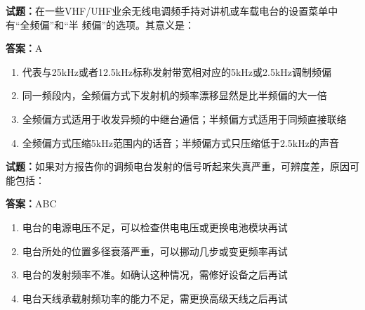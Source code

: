 \documentclass{ctexbook}
\begin{document}





\vspace{1em}

\textbf{试题：}在一些VHF/UHF业余无线电调频手持对讲机或车载电台的设置菜单中有“全频偏”和“半
频偏”的选项。其意义是： 

\textbf{答案：}A 

\begin{enumerate}[leftmargin=3em]
  \item 代表与25kHz或者12.5kHz标称发射带宽相对应的5kHz或2.5kHz调制频偏 

  \item 同一频段内，全频偏方式下发射机的频率漂移显然是比半频偏的大一倍 

  \item 全频偏方式适用于收发异频的中继台通信；半频偏方式适用于同频直接联络 

  \item 全频偏方式压缩5kHz范围内的话音；半频偏方式只压缩低于2.5kHz的声音 

\end{enumerate}





\vspace{1em}

\textbf{试题：}如果对方报告你的调频电台发射的信号听起来失真严重，可辨度差，原因可能包括： 

\textbf{答案：}ABC 

\begin{enumerate}[leftmargin=3em]
  \item 电台的电源电压不足，可以检查供电电压或更换电池模块再试 

  \item 电台所处的位置多径衰落严重，可以挪动几步或变更频率再试 

  \item 电台的发射频率不准。如确认这种情况，需修好设备之后再试 

  \item 电台天线承载射频功率的能力不足，需更换高级天线之后再试 

\end{enumerate}


\end{document}
